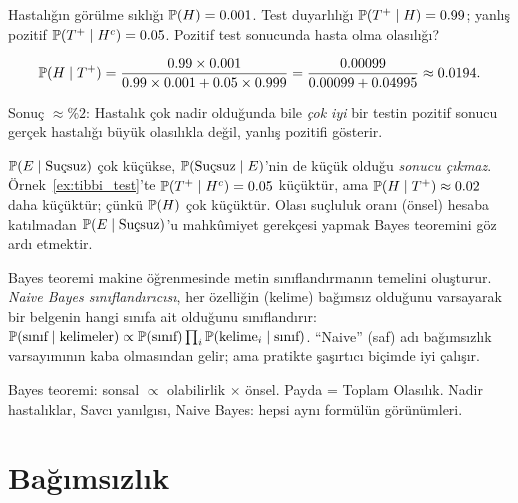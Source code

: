 \begin{ornek}\label{ex:tibbi_test}
Hastalığın görülme sıklığı $\mathbb{P}(H) = 0.001$. Test duyarlılığı
$\mathbb{P}(T^+ \mid H) = 0.99$; yanlış pozitif $\mathbb{P}(T^+ \mid H^c) = 0.05$.
Pozitif test sonucunda hasta olma olasılığı?

\[
  \mathbb{P}(H \mid T^+)
  = \frac{0.99 \times 0.001}{0.99 \times 0.001 + 0.05 \times 0.999}
  = \frac{0.00099}{0.00099 + 0.04995}
  \approx 0.0194.
\]

Sonuç $\approx \%2$: Hastalık çok nadir olduğunda bile \emph{çok iyi} bir testin
pozitif sonucu gerçek hastalığı büyük olasılıkla değil, yanlış pozitifi gösterir.
\end{ornek}

\begin{hataanalizi}
$\mathbb{P}(E \mid \text{Suçsuz})$ çok küçükse, $\mathbb{P}(\text{Suçsuz} \mid E)$'nin
de küçük olduğu \emph{sonucu çıkmaz}. Örnek~\ref{ex:tibbi_test}'te
$\mathbb{P}(T^+ \mid H^c) = 0.05$ küçüktür, ama $\mathbb{P}(H \mid T^+) \approx 0.02$
daha küçüktür; çünkü $\mathbb{P}(H)$ çok küçüktür. Olası suçluluk oranı (önsel)
hesaba katılmadan $\mathbb{P}(E \mid \text{Suçsuz})$'u mahkûmiyet gerekçesi yapmak
Bayes teoremini göz ardı etmektir.
\end{hataanalizi}

\begin{disiplinlerarasibaglan}
Bayes teoremi makine öğrenmesinde metin sınıflandırmanın temelini oluşturur.
\emph{Naive Bayes sınıflandırıcısı}, her özelliğin (kelime) bağımsız olduğunu
varsayarak bir belgenin hangi sınıfa ait olduğunu sınıflandırır:
$\mathbb{P}(\text{sınıf} \mid \text{kelimeler}) \propto \mathbb{P}(\text{sınıf}) \prod_i \mathbb{P}(\text{kelime}_i \mid \text{sınıf})$.
``Naive'' (saf) adı bağımsızlık varsayımının kaba olmasından gelir; ama pratikte
şaşırtıcı biçimde iyi çalışır.
\end{disiplinlerarasibaglan}

\begin{mikroozet}[§2.4 özeti]
Bayes teoremi: sonsal $\propto$ olabilirlik $\times$ önsel.
Payda = Toplam Olasılık. Nadir hastalıklar, Savcı yanılgısı, Naive Bayes:
hepsi aynı formülün görünümleri.
\end{mikroozet}


\section{Bağımsızlık}

